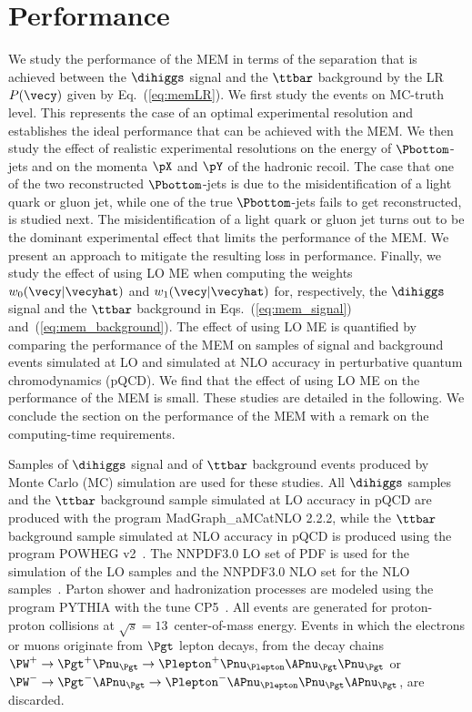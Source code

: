 \section{Performance}
\label{sec:performance}

We study the performance of the MEM in terms of the separation that is achieved between the $\dihiggs$ signal and the $\ttbar$ background
by the LR $P(\vecy)$ given by Eq.~(\ref{eq:memLR}).
We first study the events on MC-truth level.
This represents the case of an optimal experimental resolution and establishes the ideal performance that can be achieved with the MEM.
We then study the effect of realistic experimental resolutions on the energy of $\Pbottom$-jets and on the momenta $\pX$ and $\pY$ of the hadronic recoil.
The case that one of the two reconstructed $\Pbottom$-jets is due to the misidentification of a light quark or gluon jet,
while one of the true $\Pbottom$-jets fails to get reconstructed, is studied next.
The misidentification of a light quark or gluon jet turns out to be the dominant experimental effect
that limits the performance of the MEM.
We present an approach to mitigate the resulting loss in performance.
Finally, we study the effect of using LO ME when computing the weights $w_{0}(\vecy|\vecyhat)$ and $w_{1}(\vecy|\vecyhat)$ 
for, respectively, the $\dihiggs$ signal and the $\ttbar$ background in Eqs.~(\ref{eq:mem_signal}) and~(\ref{eq:mem_background}).
The effect of using LO ME is quantified by comparing the performance of the MEM on samples of signal and background events simulated at LO and simulated at NLO accuracy
in perturbative quantum chromodynamics (pQCD).
We find that the effect of using LO ME on the performance of the MEM is small.
These studies are detailed in the following.
We conclude the section on the performance of the MEM with a remark on the computing-time requirements.

Samples of $\dihiggs$ signal and of $\ttbar$ background events produced by Monte Carlo (MC) simulation are used for these studies.
All $\dihiggs$ samples and the $\ttbar$ background sample simulated at LO accuracy in pQCD are produced with the program MadGraph\_aMCatNLO 2.2.2,
while the $\ttbar$ background sample simulated at NLO accuracy in pQCD is produced using the program POWHEG v2~\cite{POWHEG1,POWHEG2,POWHEG3}.
The NNPDF3.0 LO set of PDF is used for the simulation of the LO samples and the NNPDF3.0 NLO set for the NLO samples~\cite{NNPDF1,NNPDF2,NNPDF3}.
Parton shower and hadronization processes are modeled using the program PYTHIA with the tune CP5~\cite{PYTHIA_CP5tune_CMS}.
All events are generated for proton-proton collisions at $\sqrt{s} = 13$~\TeV center-of-mass energy.
Events in which the electrons or muons originate from $\Pgt$ lepton decays,
\ie from the decay chains $\PW^{+} \to \Pgt^{+}\Pnu_{\Pgt} \to \Plepton^{+}\Pnu_{\Plepton}\APnu_{\Pgt}\Pnu_{\Pgt}$ or 
$\PW^{-} \to \Pgt^{-}\APnu_{\Pgt} \to \Plepton^{-}\APnu_{\Plepton}\Pnu_{\Pgt}\APnu_{\Pgt}$, are discarded.


